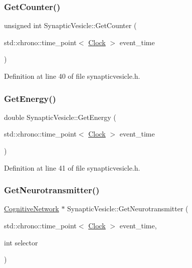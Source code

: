 \subsubsection{\texorpdfstring{Get\+Counter()}{GetCounter()}}
{\footnotesize\ttfamily unsigned int Synaptic\+Vesicle\+::\+Get\+Counter (\begin{DoxyParamCaption}\item[{std\+::chrono\+::time\+\_\+point$<$ \mbox{\hyperlink{universe_8h_a0ef8d951d1ca5ab3cfaf7ab4c7a6fd80}{Clock}} $>$}]{event\+\_\+time }\end{DoxyParamCaption})\hspace{0.3cm}{\ttfamily [inline]}}



Definition at line 40 of file synapticvesicle.\+h.

\mbox{\label{class_synaptic_vesicle_a0c4d7e936023cf0f719d0a4d3f315c9c}} 
\subsubsection{\texorpdfstring{Get\+Energy()}{GetEnergy()}}
{\footnotesize\ttfamily double Synaptic\+Vesicle\+::\+Get\+Energy (\begin{DoxyParamCaption}\item[{std\+::chrono\+::time\+\_\+point$<$ \mbox{\hyperlink{universe_8h_a0ef8d951d1ca5ab3cfaf7ab4c7a6fd80}{Clock}} $>$}]{event\+\_\+time }\end{DoxyParamCaption})\hspace{0.3cm}{\ttfamily [inline]}}



Definition at line 41 of file synapticvesicle.\+h.

\mbox{\label{class_synaptic_vesicle_a3bdf4423899d438b5a1d2246c52c8c45}} 
\subsubsection{\texorpdfstring{Get\+Neurotransmitter()}{GetNeurotransmitter()}}
{\footnotesize\ttfamily \mbox{\hyperlink{class_cognitive_network}{Cognitive\+Network}} $\ast$ Synaptic\+Vesicle\+::\+Get\+Neurotransmitter (\begin{DoxyParamCaption}\item[{std\+::chrono\+::time\+\_\+point$<$ \mbox{\hyperlink{universe_8h_a0ef8d951d1ca5ab3cfaf7ab4c7a6fd80}{Clock}} $>$}]{event\+\_\+time,  }\item[{int}]{selector }\end{DoxyParamCaption})}



